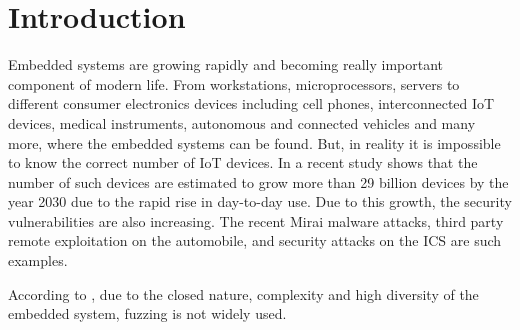 
\chapter{Introduction}

Embedded systems are growing rapidly and becoming really important component of modern life. From
workstations, microprocessors, servers to different consumer electronics devices including
cell phones, interconnected IoT devices, medical instruments, autonomous and connected vehicles
and many more, where the embedded systems can be found\cite{camposano1996embedded:ARTICLE}. But, in
reality it is impossible to know the correct number of IoT devices. In a recent study
shows\cite{IoTconne16:online} that the number of such devices are estimated to grow more than 29
billion devices by the year 2030 due to the rapid rise in day-to-day use. Due to this growth, the
security vulnerabilities are also increasing. The recent Mirai malware attacks, third party remote
exploitation on the automobile, and security attacks on the ICS are such examples\cite{muench2018you}.



According to \citeauthor{9787842}, due to the closed nature, complexity and high diversity of the
embedded system, fuzzing is not widely used.



